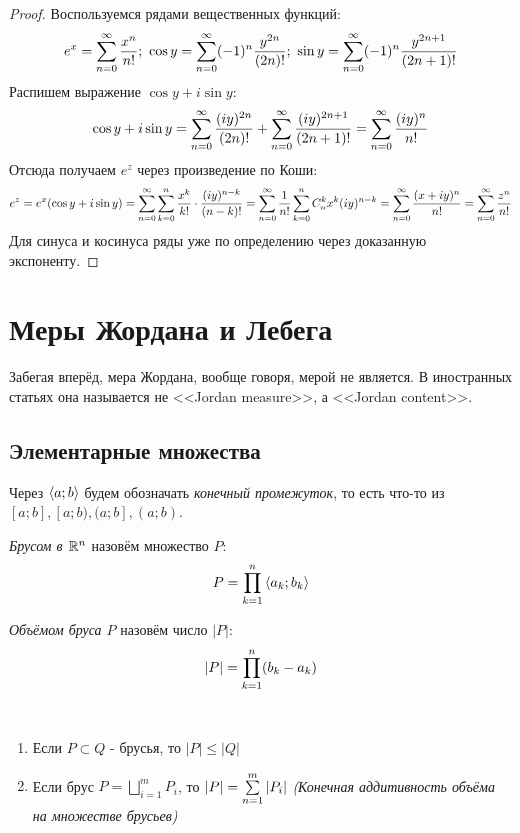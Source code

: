 \begin{proof}
	Воспользуемся рядами вещественных функций:
	\[
		e^x = \sum_{n = 0}^\infty \frac{x^n}{n!};\ \cos y = \sum_{n = 0}^\infty (-1)^n \frac{y^{2n}}{(2n)!};\ \sin y = \sum_{n = 0}^\infty (-1)^n \frac{y^{2n + 1}}{(2n + 1)!}
	\]
	Распишем выражение $\cos y + i\sin y$:
	\[
		\cos y + i\sin y = \sum_{n = 0}^\infty \frac{(iy)^{2n}}{(2n)!} + \sum_{n = 0}^\infty \frac{(iy)^{2n + 1}}{(2n + 1)!} = \sum_{n = 0}^\infty \frac{(iy)^n}{n!}
	\]
	Отсюда получаем $e^z$ через произведение по Коши:
	\[
		e^z = e^x(\cos y + i\sin y) = \sum_{n = 0}^\infty \sum\limits_{k = 0}^n \frac{x^k}{k!} \cdot \frac{(iy)^{n - k}}{(n - k)!} = \sum_{n = 0}^\infty \frac{1}{n!}\sum\limits_{k = 0}^n C_n^k x^k (iy)^{n - k} = \sum_{n = 0}^\infty \frac{(x + iy)^n}{n!} = \sum_{n = 0}^\infty \frac{z^n}{n!}
	\]
	Для синуса и косинуса ряды уже по определению через доказанную экспоненту.
\end{proof}

\section{Меры Жордана и Лебега}

\begin{note}
	Забегая вперёд, мера Жордана, вообще говоря, мерой не является. В иностранных статьях она называется не <<Jordan measure>>, а <<Jordan content>>.
\end{note}

\subsection{Элементарные множества}

\begin{note}
	Через $\left\langle a; b\right\rangle$ будем обозначать \textit{конечный промежуток}, то есть что-то из $[a; b], [a; b), (a; b], (a; b)$.
\end{note}

\begin{definition}
	\textit{Брусом в $\mathbb{R}^n$} назовём множество $P$:
	\[
		P = \prod\limits_{k = 1}^n \left\langle a_k; b_k\right\rangle
	\]
\end{definition}

\begin{definition}
	\textit{Объёмом бруса $P$} назовём число $|P|$:
	\[
		|P| = \prod\limits_{k = 1}^n (b_k - a_k)
	\]
\end{definition}

\begin{proposition}~
	\begin{enumerate}
		\item Если $P \subset Q$ - брусья, то $|P| \le |Q|$
		
		\item Если брус $P = \bigsqcup\limits_{i = 1}^m P_i$, то $|P| = \sum\limits_{n = 1}^m |P_i|$ \textit{(Конечная аддитивность объёма на множестве брусьев)}
	\end{enumerate}
\end{proposition}

